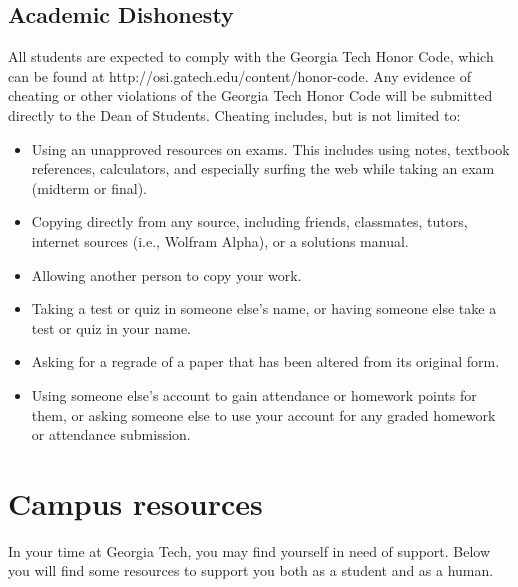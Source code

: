 \documentclass[11pt]{article}
\begin{document}
    
    \subsection{Academic Dishonesty} 
    All students are expected to comply with the Georgia Tech Honor Code, which can be found at http://osi.gatech.edu/content/honor-code. Any evidence of cheating or other violations of the Georgia Tech Honor Code will be submitted directly to the Dean of Students. Cheating includes, but is not limited to: 
    \begin{itemize}
        \item Using an unapproved resources on exams. This includes using notes, textbook references, calculators, and 
              especially surfing the web while taking an exam (midterm or final). 
        \item Copying directly from any source, including friends, classmates, tutors, internet sources (i.e., Wolfram Alpha), or a solutions manual.
        \item Allowing another person to copy your work.
        \item Taking a test or quiz in someone else's name, or having someone else take a test or quiz in your name.
        \item Asking for a regrade of a paper that has been altered from its original form.
        \item Using someone else’s account to gain attendance or homework points for them, or asking someone else to use your account for any graded homework or attendance submission.
    \end{itemize}

\section{Campus resources}

In your time at Georgia Tech, you may find yourself in need of support. Below you will find some resources to support you both as a student and as a human.  
\end{document}
